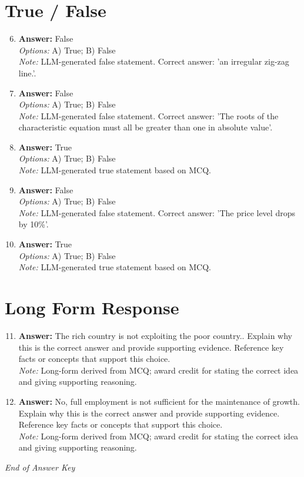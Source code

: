 \documentclass[12pt]{article}
\begin{document}
\section*{True / False}
\begin{enumerate}[label=\arabic*.]
\setcounter{enumi}{5}
\item \textbf{Answer:} False
\\ \textit{Options:} A) True; B) False
\\ \textit{Note:} LLM-generated false statement. Correct answer: 'an irregular zig-zag line.'.
\item \textbf{Answer:} False
\\ \textit{Options:} A) True; B) False
\\ \textit{Note:} LLM-generated false statement. Correct answer: 'The roots of the characteristic equation must all be greater than one in absolute value'.
\item \textbf{Answer:} True
\\ \textit{Options:} A) True; B) False
\\ \textit{Note:} LLM-generated true statement based on MCQ.
\item \textbf{Answer:} False
\\ \textit{Options:} A) True; B) False
\\ \textit{Note:} LLM-generated false statement. Correct answer: 'The price level drops by 10\%'.
\item \textbf{Answer:} True
\\ \textit{Options:} A) True; B) False
\\ \textit{Note:} LLM-generated true statement based on MCQ.
\end{enumerate}

\section*{Long Form Response}
\begin{enumerate}[label=\arabic*.]
\setcounter{enumi}{10}
\item \textbf{Answer:} The rich country is not exploiting the poor country.. Explain why this is the correct answer and provide supporting evidence. Reference key facts or concepts that support this choice.
\\ \textit{Note:} Long-form derived from MCQ; award credit for stating the correct idea and giving supporting reasoning.
\item \textbf{Answer:} No, full employment is not sufficient for the maintenance of growth. Explain why this is the correct answer and provide supporting evidence. Reference key facts or concepts that support this choice.
\\ \textit{Note:} Long-form derived from MCQ; award credit for stating the correct idea and giving supporting reasoning.
\end{enumerate}

\vfill
\noindent\textit{End of Answer Key}
\end{document}
